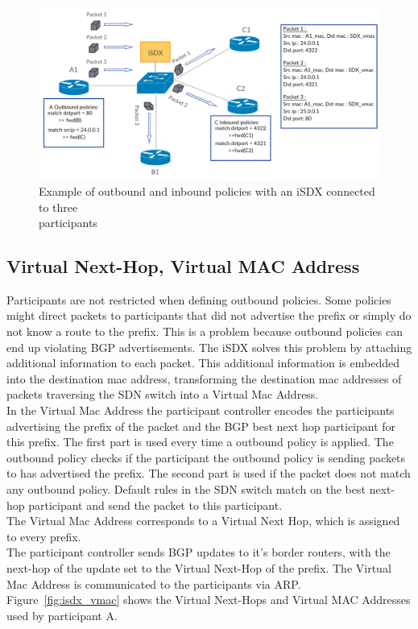 \begin{figure}[h]
\includegraphics[scale = 0.32]{Figures/bckgrnd_sdx_policies.pdf}
\caption{Example of outbound and inbound policies with an iSDX connected to three \\ participants}
\label{fig:isdx_policies}
\end{figure}
  

\subsection{\label{chapter2:iSDX:VNH_VMAC}Virtual Next-Hop, Virtual MAC Address}


Participants are not restricted when defining outbound policies. Some policies might direct packets to participants that did not advertise the prefix or simply do not know a route to the prefix. This is a problem because outbound policies can end up violating BGP advertisements. The iSDX solves this problem by attaching additional information to each packet. This additional information is embedded into the destination mac address, transforming the destination mac addresses of packets traversing the SDN switch into a Virtual Mac Address. \\ 
In the Virtual Mac Address the participant controller encodes the participants advertising the prefix of the packet and the BGP best next hop participant for this prefix. The first part is used every time a outbound policy is applied. The outbound policy checks if the participant the outbound policy is sending packets to has advertised the prefix. The second part is used if the packet does not match any outbound policy. Default rules in the SDN switch match on the best next-hop participant and send the packet to this participant. \\
The Virtual Mac Address corresponds to a Virtual Next Hop, which is assigned to every prefix. \\ The participant controller sends BGP updates to it's border routers, with the next-hop of the update set to the Virtual Next-Hop of the prefix. The Virtual Mac Address is communicated to the participants via ARP. \\
Figure~\ref{fig:isdx_vmac} shows the Virtual Next-Hops and Virtual MAC Addresses used by participant A.

